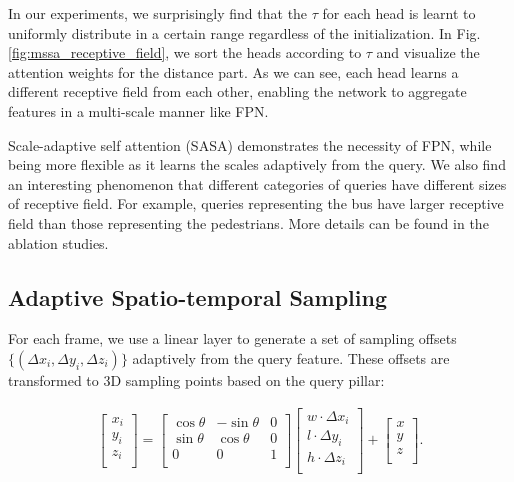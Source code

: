 \documentclass[10pt,twocolumn,letterpaper]{article}
\begin{document}
In our experiments, we surprisingly find that the $\tau$ for each head is learnt to uniformly distribute in a certain range regardless of the initialization. In Fig. \ref{fig:mssa_receptive_field}, we sort the heads according to $\tau$ and visualize the attention weights for the distance part. As we can see, each head learns a different receptive field from each other, enabling the network to aggregate features in a multi-scale manner like FPN.

Scale-adaptive self attention (SASA) demonstrates the necessity of FPN, while being more flexible as it learns the scales adaptively from the query. We also find an interesting phenomenon that different categories of queries have different sizes of receptive field. For example, queries representing the bus have larger receptive field than those representing the pedestrians. More details can be found in the ablation studies.

\subsection{Adaptive Spatio-temporal Sampling}

For each frame, we use a linear layer to generate a set of sampling offsets $\{(\Delta x_i, \Delta y_i, \Delta z_i)\}$ adaptively from the query feature. These offsets are transformed to 3D sampling points based on the query pillar:

\begin{align}
  \left[\!\begin{array}{c}
    x_i \\
    y_i \\
    z_i \\
  \end{array}\!\right] \! = \! 
  \left[\!\!\begin{array}{cccc}
    \cos\theta\!\!\! & -\!\sin\theta\!\!\! & 0\! \\
    \sin\theta\!\!\! & \cos\theta\!\!\! & 0\! \\
    0\!\!\! & 0\!\!\! & 1\! \\
  \end{array}\!\!\right]\!\!
  \left[\!\!\begin{array}{c}
    w \!\cdot\! \Delta x_i \\
    l \!\cdot\! \Delta y_i \\
    h \!\cdot\! \Delta z_i \\
  \end{array}\!\!\right] \! + \!
  \left[\!\begin{array}{c}
    x \\
    y \\
    z \\
  \end{array}\!\right].
\end{align}
\end{document}
